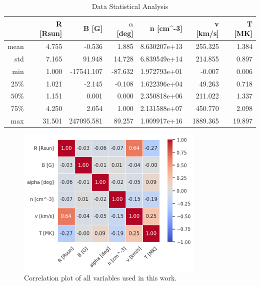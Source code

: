 \begin{table}[h]
    \caption{Data Statistical Analysis}
    \label{tab:data_stats}
    \begin{tabular}{@{}rrrrrrr@{}}
    \toprule
    \textbf{} & \textbf{R {[}Rsun{]}} & \textbf{B {[}G{]}} & \textbf{$\alpha$ {[}deg{]}} & \textbf{n {[}cm\textasciicircum{}-3{]}} & \textbf{v {[}km/s{]}} & \textbf{T {[}MK{]}} \\ \midrule
    mean      & 4.755                 & -0.536             & 1.885                    & 8.630207e+13                            & 255.325               & 1.384               \\
    std       & 7.165                 & 91.948             & 14.728                   & 6.839549e+14                            & 214.855               & 0.897               \\
    min       & 1.000                 & -17541.107         & -87.632                  & 1.972793e+01                            & -0.007                & 0.006               \\
    $25\%$    & 1.021                 & -2.145             & -0.108                   & 1.622396e+04                            & 49.263                & 0.718               \\
    $50\%$    & 1.151                 & 0.001              & 0.000                    & 2.350818e+06                            & 211.022               & 1.337               \\
    $75\%$    & 4.250                 & 2.054              & 1.000                    & 2.131588e+07                            & 450.770               & 2.098               \\
    max       & 31.501                & 247095.581         & 89.257                   & 1.009917e+16                            & 1889.365              & 19.897              \\ \bottomrule
    \end{tabular}
\end{table}


\begin{figure}[h]
    \centering
    \includegraphics[width=0.8\textwidth]{figures/variables_corrplot.png}
    \caption{Correlation plot of all variables used in this work.}
    \label{fig:corrplot}
\end{figure}

